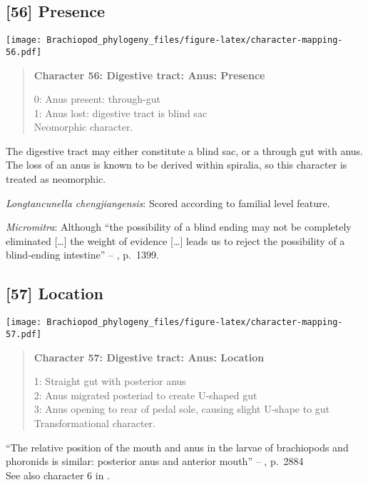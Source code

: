 \documentclass[openany]{book}
\theoremstyle{definition}
\theoremstyle{definition}
\theoremstyle{definition}
\theoremstyle{remark}
\begin{document}
\subsection*{{[}56{]} Presence}\label{presence-2}

\texttt{[image: Brachiopod\_phylogeny\_files/figure-latex/character-mapping-56.pdf]}

\begin{quote}
\textbf{Character 56: Digestive tract: Anus: Presence}

0: Anus present: through-gut\\
1: Anus lost: digestive tract is blind sac\\
Neomorphic character.
\end{quote}

The digestive tract may either constitute a blind sac, or a through gut
with anus. The loss of an anus is known to be derived within spiralia,
so this character is treated as neomorphic.

\hypertarget{Longtancunella_chengjiangensis-coding-56}{}
\emph{Longtancunella chengjiangensis}: Scored according to familial
level feature.

\hypertarget{Micromitra-coding-56}{}
\emph{Micromitra}: Although ``the possibility of a blind ending may not
be completely eliminated {[}\ldots{}{]} the weight of evidence
{[}\ldots{}{]} leads us to reject the possibility of a blind-ending
intestine'' -- \citet{Zhang2007Rhynchonelliformeanbrachiopods}, p.~1399.

\subsection*{{[}57{]} Location}\label{location}

\texttt{[image: Brachiopod\_phylogeny\_files/figure-latex/character-mapping-57.pdf]}

\begin{quote}
\textbf{Character 57: Digestive tract: Anus: Location}

1: Straight gut with posterior anus\\
2: Anus migrated posteriad to create U-shaped gut\\
3: Anus opening to rear of pedal sole, causing slight U-shape to gut\\
Transformational character.
\end{quote}

``The relative position of the mouth and anus in the larvae of
brachiopods and phoronids is similar: posterior anus and anterior
mouth'' -- \citet{Williams2007Supplement}, p.~2884\\
See also character 6 in \citet{Haszprunar2008}.
\end{document}
